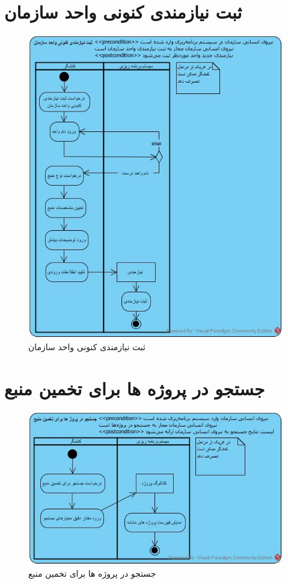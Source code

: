 \section{ثبت نیازمندی کنونی واحد سازمان}
\begin{figure}[H]
	\centering
	\includegraphics[scale=0.7]{img/activity/AddRequirementToUnit}
	\caption{ثبت نیازمندی کنونی واحد سازمان}
\end{figure}

\section{جستجو در پروژه ها برای تخمین منبع}
\begin{figure}[H]
	\centering
	\includegraphics[scale=0.8]{img/activity/SearchInProjects}
	\caption{جستجو در پروژه ها برای تخمین منبع}
\end{figure}

